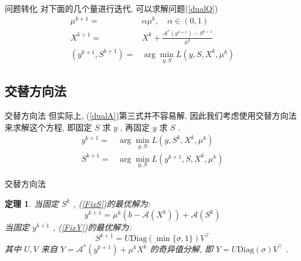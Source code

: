 \documentclass[slidestop,compress,mathserif,UTF8]{beamer}
\newtheorem{theo}{\bf \textcolor[rgb]{0.8,0,0}{定理}}[section]  %
\numberwithin{equation}{section}                                %
\begin{document}
            \begin{frame}[t]{问题转化}
                对下面的几个量进行迭代, 可以求解问题(\ref{dualQ})
                \begin{equation}
                    \begin{split}\label{dualA}
                            \mu^{k + 1}
                        =	& \alpha \mu^k, \quad \alpha \in (0,1)\\
                            X^{k + 1}
                        =	& X^k + \frac{\mathcal{A}^*(y^{k + 1}) - S^{k + 1}}{\mu^k}\\
                            (y^{k + 1}, S^{k + 1}) 
                        =	& \arg \min_{y, S}L(y, S, X^k, \mu^k)
                    \end{split}
                \end{equation}
            \end{frame}
        \subsection{交替方向法}
            \begin{frame}[t]{交替方向法}
                但实际上, (\ref{dualA})第三式并不容易解, 因此我们考虑使用交替方向法来求解这个方程, 即固定 $S$ 求 $y$ , 再固定 $y$ 求 $S$ .
                \begin{align}
                        y^{k + 1}
                    =	& \arg \min_{y, S}L(y, S^k, X^k, \mu^k) \label{FixS}\\
                        S^{k + 1}
                    =	& \arg \min_{y, S}L(y^{k + 1}, S, X^k, \mu^k) \label{FixY}
                \end{align}
            \end{frame}
            \begin{frame}[t]{交替方向法}
                \begin{theo}
                    当固定 $S^k$ , (\ref{FixS})的最优解为:
                        \begin{equation}\label{dualAY}
                            y^{k + 1} = \mu^k(b - \mathcal{A}(X^k)) + \mathcal{A}(S^k)
                        \end{equation}
                    当固定 $y^{k + 1}$ , (\ref{FixY})的最优解为:
                        \begin{equation}\label{dualAS}
                            S^{k + 1} = U \text{Diag}(\min \{\sigma, 1\}) V^\top
                        \end{equation}
                    其中 $U, V$ 来自 $Y = \mathcal{A}^*(y^{k + 1}) + \mu^k X^k$ 的奇异值分解, 即 $Y = U \text{Diag}(\sigma) V^\top$ .
                \end{theo}
            \end{frame}
\end{document}
